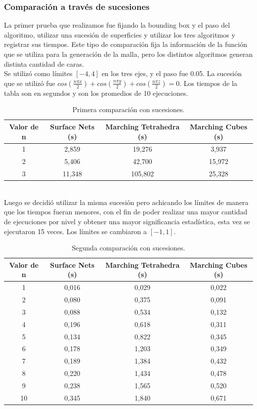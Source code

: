 \documentclass[12pt]{article}
\begin{document}
\subsubsection{Comparación a través de sucesiones}
La primer prueba que realizamos fue fijando la bounding box y el paso del algoritmo, utilizar una sucesión de superficies y utilizar los tres algoritmos y registrar sus tiempos. Este tipo de comparación fija la información de la función que se utiliza para la generación de la malla, pero los distintos algoritmos generan distinta cantidad de caras.
\\Se utilizó como límites $[-4,4]$ en los tres ejes, y el paso fue 0.05. La sucesión que se utilizó fue $cos(\frac{n\pi x}{2}) + cos(\frac{n\pi y}{2}) +cos(\frac{n\pi z}{2}) =0$. Los tiempos de la tabla son en segundos y son los promedios de 10 ejecuciones.
\begin{table}[h!]
  \centering
  \label{tab:table1}
  \begin{tabular}{cccc}
    \toprule
    Valor de n & Surface Nets (s) & Marching Tetrahedra (s) & Marching Cubes (s)\\
    \midrule
    1 & 2,859 & 19,276 & 3,937\\
    2 & 5,406 & 42,700 & 15,972\\
    3 & 11,348 & 105,802 & 25,328\\
    \bottomrule
  \end{tabular}
  \caption{Primera comparación con sucesiones.}
\end{table}
\\Luego se decidió utilizar la misma sucesión pero achicando los límites de manera que los tiempos fueran menores, con el fin de poder realizar una mayor cantidad de ejecuciones por nivel y obtener una mayor significancia estadística, esta vez se ejecutaron 15 veces. Los límites se cambiaron a $[-1,1]$. \\
\begin{table}[h!]
  \centering
  \label{tab:table1}
  \begin{tabular}{cccc}
    \toprule
    Valor de n & Surface Nets (s) & Marching Tetrahedra (s) & Marching Cubes (s)\\
    \midrule
    1 & 0,016 & 0,029 & 0,022\\
    2 & 0,080 & 0,375 & 0,091\\
    3 & 0,088 & 0,534 & 0,132\\
    4 & 0,196 & 0,618 & 0,311\\
    5 & 0,134 & 0,822 & 0,345\\
    6 & 0,178 & 1,203 & 0,349\\
    7 & 0,189 & 1,384 & 0,432\\
    8 & 0,220 & 1,434 & 0,478\\
    9 & 0,238 & 1,565 & 0,520\\
    10 & 0,345 & 1,840 & 0,671\\
    \bottomrule
  \end{tabular}
  \caption{Segunda comparación con sucesiones.}
\end{table}
\end{document}
